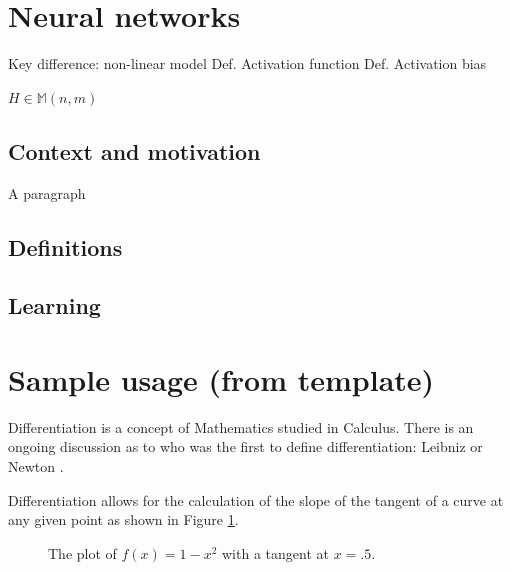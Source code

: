 \documentclass[a4paper]{article}
\theoremstyle{break}
\newcommand{\Mat}[2]{\mathbb{M}(#1, #2)}
\begin{document}
\section{Neural networks}
Key difference: non-linear model
Def. Activation function
Def. Activation bias

$H \in \Mat{n}{m}$
\subsection{Context and motivation}
A paragraph
\subsection{Definitions}
\subsection{Learning}












































\pagebreak
\section{Sample usage (from template)}

Differentiation is a concept of Mathematics studied in Calculus. There is an ongoing discussion as to who was the first to define differentiation: Leibniz or Newton \cite{bardi2006calculus}.

Differentiation allows for the calculation of the slope of the tangent of a curve at any given point as shown in Figure \ref{exampleplot}.

\begin{figure}[!htbp]
\begin{center}
\end{center}
\caption{The plot of $f(x)=1-x^2$ with a tangent at $x=.5$.}\label{exampleplot}
\end{figure}
\end{document}
